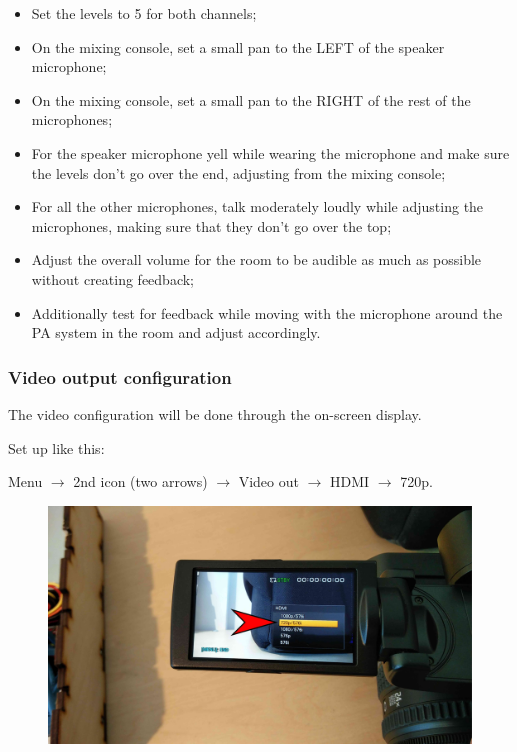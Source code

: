 \documentclass{article}
\begin{document}
\begin{itemize}
  \item Set the levels to 5 for both channels;
  \item On the mixing console, set a small pan to the LEFT of the speaker microphone;
  \item On the mixing console, set a small pan to the RIGHT of the rest of the microphones;
  \item For the speaker microphone yell while wearing the microphone and make sure the levels don't go over the end, adjusting from the mixing console;
  \item For all the other microphones, talk moderately loudly while adjusting the microphones, making sure that they don't go over the top;
  \item Adjust the overall volume for the room to be audible as much as possible without creating feedback;
  \item Additionally test for feedback while moving with the microphone around the PA system in the room and adjust accordingly.
\end{itemize}

\subsubsection{Video output configuration}
The video configuration will be done through the on-screen display.

Set up like this:

Menu $\rightarrow$ 2nd icon (two arrows) $\rightarrow$ Video out $\rightarrow$ HDMI $\rightarrow$ 720p.
\begin{figure}[H]
  \centering
\includegraphics[width = 120mm]{Sony05.jpg}
\end{figure}
\end{document}
